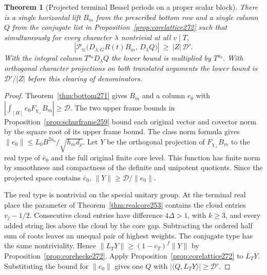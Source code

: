 \documentclass[a4paper,11pt]{article}
\newtheorem{theorem}[proposition]{Theorem}
\theoremstyle{definition}
\theoremstyle{remark}
\numberwithin{equation}{section}
\begin{document}
\begin{theorem}[Projected terminal Bessel periods on a proper scalar block]\leavevmode
\label{thm:corepair272}
There is a single horizontal lift \(B_m\) from the prescribed
bottom row and a single column \(Q\) from the conjugate list in
Proposition~\ref{prop:corelattice272} such that simultaneously
for every character \(\lambda\) nontrivial at all \(v\mid T\),
\[
 \left|\mathcal P_\varpi\bigl(D_{\lambda,G}R(t)B_m,\,
                              D_\lambda Q\bigr)\right|
       \ \ge\ |Z|\,\mathcal D' .
\]
With the integral column \(T^{a_0}D_\lambda Q\) the lower
bound is multiplied by \(T^{a_0}\). With orthogonal character
projections on both translated arguments the lower bound is
\(\mathcal D'/|Z|\) before this clearing of denominators.
\end{theorem}
\begin{proof}
Theorem~\ref{thm:bottom271} gives \(B_m\) and a column \(e_0\)
with \(|\int_{[H]} e_0 F_{\chi_+}B_m|\ge\mathcal D\). The
two upper frame bounds in Proposition~\ref{prop:schurframe259}
bound each original vector and covector norm by the square
root of its upper frame bound. The class norm formula gives
\(\|e_0\|\le L_0 B^{2a_0}/\sqrt{h_m d_\rho}\).
Let \(Y\) be the orthogonal projection of \(F_{\chi_+}B_m\)
to the real type of \(\bar e_0\) and the full original finite
core level. This function has finite norm by smoothness and
compactness of the definite and unipotent quotients. Since
the projected space contains \(\bar e_0\),
\(\|Y\|\ge\mathcal D/\|e_0\|\).

The real type is nontrivial on the special unitary group.
At the terminal real place the parameter of
Theorem~\ref{thm:realcore253} contains the cloud entries
\(v_j-1/2\). Consecutive cloud entries have difference
\(4\Delta>1\), with \(k\ge3\), and every added string lies
above the cloud by the core gap. Subtracting the ordered
half sum of roots leaves an unequal pair of highest weights.
The conjugate type has the same nontriviality. Hence
\(\|L_TY\|\ge(1-c_T)^f\|Y\|\) by
Proposition~\ref{prop:corehecke272}. Apply
Proposition~\ref{prop:corelattice272} to \(L_TY\).
Substituting the bound for \(\|e_0\|\) gives one \(Q\)
with \(|\langle Q,L_TY\rangle|\ge\mathcal D'\).


\end{proof}
\end{document}
